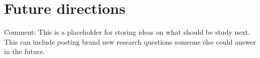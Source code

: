 \section{Future directions}
Comment: This is a placeholder for storing ideas on what should be study next.
This can include posting brand new research questions someone else could answer in the future.
